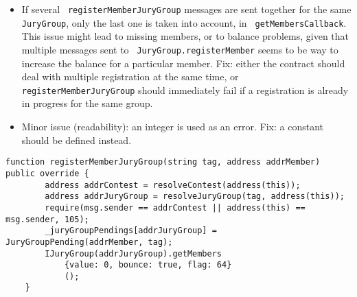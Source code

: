 \begin{itemize}
\item {} {If several {\tt
    registerMemberJuryGroup} messages are sent together for the same
  {\tt JuryGroup}, only the last one is taken into account, in {\tt
    getMembersCallback}. This issue might lead to missing members, or
  to balance problems, given that multiple messages sent to {\tt
    JuryGroup.registerMember} seems to be way to increase the balance
  for a particular member. Fix: either the contract should deal with
  multiple registration at the same time, or {\tt
    registerMemberJuryGroup} should immediately fail if a registration
  is already in progress for the same group.  }
\item Minor issue (readability): an integer is used as an error. Fix:
  a constant should be defined instead.
\end{itemize}

\begin{lstlisting}[firstnumber=120]
    function registerMemberJuryGroup(string tag, address addrMember) public override {
        address addrContest = resolveContest(address(this));
        address addrJuryGroup = resolveJuryGroup(tag, address(this));
        require(msg.sender == addrContest || address(this) == msg.sender, 105);
        _juryGroupPendings[addrJuryGroup] = JuryGroupPending(addrMember, tag);
        IJuryGroup(addrJuryGroup).getMembers
            {value: 0, bounce: true, flag: 64}
            ();
    }
\end{lstlisting}
